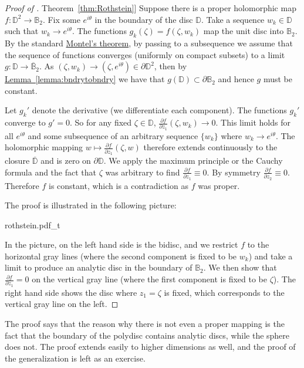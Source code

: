 \documentclass[12pt,openany]{book}
\newcommand{\D}{{\mathbb{D}}}
\newcommand{\bB}{{\mathbb{B}}}
\newcommand{\bD}{{\mathbb{D}}}
\theoremstyle{plain}
\theoremstyle{remark}
\theoremstyle{definition}
\newenvironment{myfig}{%
    \begin{center}
}{%
    \end{center}
}
\theoremstyle{exercise}
\theoremstyle{example}
\newcommand{\thmref}[1]{\hyperref[#1]{Theorem~\ref*{#1}}}
\newcommand{\lemmaref}[1]{\hyperref[#1]{Lemma~\ref*{#1}}}
\begin{document}
\begin{proof}[Proof of \thmref{thm:Rothstein}]
Suppose there is a proper holomorphic map $f \colon \D^2
\to \bB_2$.
Fix some $e^{i\theta}$ in the boundary of the disc $\bD$.  Take a sequence
$w_k \in \bD$ such that $w_k \to e^{i\theta}$.   The functions
$g_k(\zeta) =  f(\zeta,w_k)$ map the unit disc into $\bB_2$.  By the standard
\hyperref[thm:onevarmontel]{Montel's theorem}, by passing to a subsequence we assume that
the sequence of functions converges (uniformly on compact subsets) to
a limit $g \colon \bD \to \overline{\bB}_2$.  As $(\zeta,w_k) \to
(\zeta,e^{i\theta}) \in \partial \D^2$, then by
\lemmaref{lemma:bndrytobndry} we have that $g(\bD) \subset \partial \bB_2$
and hence $g$ must be constant.

Let $g_k'$ denote the derivative (we differentiate each component).
The functions $g_k'$ converge
to $g' = 0$. So for any fixed $\zeta \in \bD$,
$\frac{\partial f}{\partial z_1} (\zeta, w_k) \to 0$.
This limit holds for all $e^{i\theta}$ and some subsequence of
an arbitrary sequence $\{ w_k \}$ where $w_k \to e^{i\theta}$.  The
holomorphic mapping $w \mapsto \frac{\partial f}{\partial z_1} (\zeta, w)$
therefore extends continuously
to the closure $\overline{\D}$ and is zero on $\partial \D$.
We apply the maximum
principle or the Cauchy formula and the fact that $\zeta$ was arbitrary to find 
$\frac{\partial f}{\partial z_1} \equiv 0$.  By symmetry
$\frac{\partial f}{\partial z_2} \equiv 0$.  Therefore $f$ is constant,
which is a contradiction as $f$ was proper.

\pagebreak[2]
The proof is illustrated in the following picture:

\begin{myfig}
{rothstein.pdf_t}
\end{myfig}

In the picture, on the left hand side is the bidisc, and we
restrict $f$ to the horizontal gray lines (where the second component is
fixed to be $w_k$) and take a limit to produce an analytic disc
in the boundary of $\bB_2$.  We then show that $\frac{\partial f}{\partial
z_1} = 0$ on the vertical gray line (where the first component is fixed to
be $\zeta$).  The right hand side shows the disc where $z_1 = \zeta$ is
fixed, which corresponds to the vertical gray line on the left.
\end{proof}

The proof says that the reason why there is not even a proper mapping is the fact
that the boundary of the polydisc contains analytic discs, while
the sphere does not.
The proof extends easily to higher dimensions as well, and the proof
of the generalization is left as an exercise.
\end{document}

